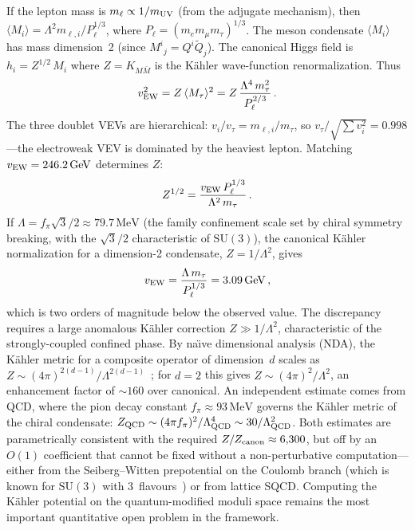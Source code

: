 \documentclass[12pt,a4paper]{article}
\newcommand{\SU}{\mathrm{SU}}
\newcommand{\MeV}{\,\mathrm{MeV}}
\newcommand{\GeV}{\,\mathrm{GeV}}
\begin{document}
If the lepton mass is $m_\ell \propto 1/m_{\rm UV}$ (from the adjugate
mechanism), then $\langle M_i \rangle = \Lambda^2 m_{\ell,i}/P_\ell^{1/3}$,
where $P_\ell = (m_e m_\mu m_\tau)^{1/3}$.
The meson condensate $\langle M_i\rangle$ has mass dimension~2
(since $M^i{}_j = Q^i\tilde{Q}_j$). The canonical Higgs field is
$h_i = Z^{1/2}\,M_i$ where $Z = K_{M\bar M}$ is the K\"ahler
wave-function renormalization. Thus
\begin{equation}
  v_{\rm EW}^2 = Z\,\langle M_\tau\rangle^2
  = Z\,\frac{\Lambda^4\,m_\tau^2}{P_\ell^{2/3}}\,.
  \label{eq:vew}
\end{equation}
The three doublet VEVs are hierarchical:
$v_i/v_\tau = m_{\ell,i}/m_\tau$, so
$v_\tau/\sqrt{\sum v_i^2} = 0.998$---the electroweak VEV is
dominated by the heaviest lepton.
Matching $v_{\rm EW} = 246.2\GeV$ determines $Z$:
\begin{equation}
  Z^{1/2} = \frac{v_{\rm EW}\,P_\ell^{1/3}}{\Lambda^2\,m_\tau}\,.
  \label{eq:Zfactor}
\end{equation}
If $\Lambda = f_\pi\sqrt{3}/2 \approx 79.7\MeV$ (the family
confinement scale set by chiral symmetry breaking, with the
$\sqrt{3}/2$ characteristic of $\SU(3)$), the canonical K\"ahler
normalization for a dimension-2 condensate,
$Z = 1/\Lambda^2$, gives
\begin{equation}
  v_{\rm EW} = \frac{\Lambda\,m_\tau}{P_\ell^{1/3}}
  = 3.09\GeV\,,
  \label{eq:vew_canon}
\end{equation}
which is two orders of magnitude below the observed value.
The discrepancy requires a large anomalous K\"ahler correction
$Z \gg 1/\Lambda^2$, characteristic of the strongly-coupled
confined phase. By na\"{\i}ve dimensional analysis (NDA), the
K\"ahler metric for a composite operator of dimension~$d$ scales as
$Z \sim (4\pi)^{2(d-1)}/\Lambda^{2(d-1)}$~\cite{Luty:1998}; for
$d=2$ this gives $Z \sim (4\pi)^2/\Lambda^2$, an enhancement
factor of $\sim 160$ over canonical.
An independent estimate comes from QCD, where the pion decay
constant $f_\pi \approx 93\MeV$ governs the K\"ahler metric of
the chiral condensate: $Z_{\rm QCD} \sim (4\pi f_\pi)^2/\Lambda_{\rm QCD}^4
\sim 30/\Lambda_{\rm QCD}^2$.
Both estimates are parametrically consistent with the required
$Z/Z_{\rm canon} \approx 6{,}300$, but off by an $O(1)$ coefficient that
cannot be fixed without a non-perturbative computation---either from
the Seiberg--Witten prepotential on the Coulomb branch
(which is known for $\SU(3)$ with 3~flavours~\cite{Argyres:1995wt})
or from lattice SQCD.
Computing the K\"ahler potential on the
quantum-modified moduli space remains the most important
quantitative open problem in the framework.
\end{document}
